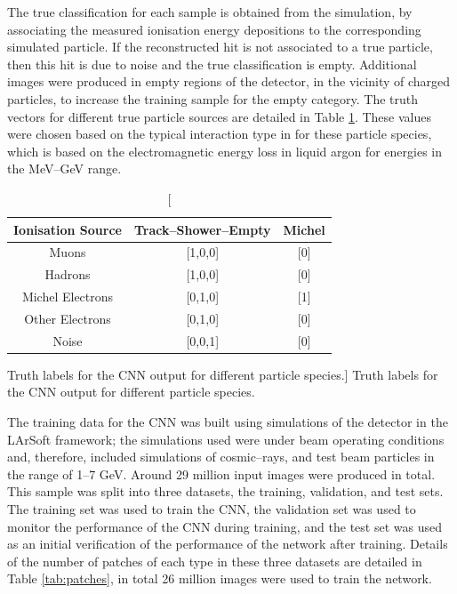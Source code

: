 The true classification for each sample is obtained from the simulation, by 
associating the measured ionisation energy depositions to the corresponding
simulated particle. If the reconstructed hit is not associated to a true
particle, then this hit is due to noise and the true classification is empty.
Additional images were produced in empty regions of the detector, in the 
vicinity of charged particles, to increase the training sample for the empty 
category. The truth vectors for different true particle sources are detailed 
in Table \ref{tab:ground_truth}. These values were chosen based on the typical 
interaction type in \protodune{} for these particle species, which is based on 
the electromagnetic energy loss in liquid argon for energies in the MeV--GeV 
range.
\begin{table}
	\centering
	\bgroup
	\def\arraystretch{1.5}
	\begin{tabular}{c|c|c}
		Ionisation Source & Track--Shower--Empty & Michel \\ \hline
		Muons             & [1,0,0]              & [0]    \\
		Hadrons           & [1,0,0]              & [0]    \\
		Michel Electrons  & [0,1,0]              & [1]    \\
		Other Electrons   & [0,1,0]              & [0]    \\
		Noise             & [0,0,1]              & [0]    \\
	\end{tabular}
	\egroup
	\caption
	[Truth labels for the CNN output for different particle species.]
	{Truth labels for the CNN output for different particle species.}
	\label{tab:ground_truth}
\end{table}

The training data for the CNN was built using simulations of the \protodune{}
detector in the LArSoft framework; the simulations used were under beam
operating conditions and, therefore, included simulations of cosmic--rays, and
test beam particles in the range of 1--7 GeV. Around 29 million input images
were produced in total. This sample was split into three datasets, the 
training, validation, and test sets. The training set was used to train the 
CNN, the validation set was used to monitor the performance of the CNN during 
training, and the test set was used as an initial verification of the 
performance of the network after training. Details of the number of patches of 
each type in these three datasets are detailed in Table \ref{tab:patches}, in
total 26 million images were used to train the network.

